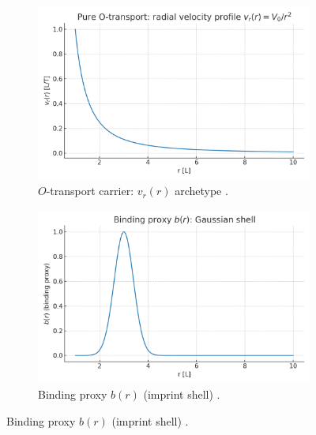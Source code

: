 \documentclass[12pt,a4paper,oneside]{scrreprt}
\begin{document}
\begin{figure}[htbp]\centering
  \begin{subfigure}[t]{0.49\linewidth}
    \includegraphics[width=\linewidth]{fig/Otransport_vr_profile.png}
    \caption{$O$-transport carrier: $v_r(r)$ archetype
      \cite{Bird2002}.}
    \label{fig:carrier:vr}
  \end{subfigure}\hfill
  \begin{subfigure}[t]{0.49\linewidth}
    \includegraphics[width=\linewidth]{fig/binding_proxy_shell.png}
    \caption{Binding proxy $b(r)$ (imprint shell)
      \cite{Schuss2009}.}
    \label{fig:carrier:b}
  \end{subfigure}


\end{figure}
\end{document}
